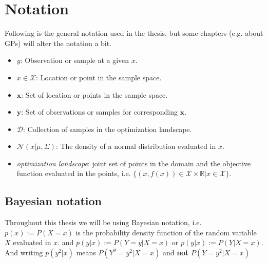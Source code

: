 

\section{Notation}
Following is the general notation used in the thesis, but some chapters (e.g. about GPs) will alter the notation a bit. 
\begin{itemize}[noitemsep]
    \item $y$: Observation or sample at a given $x$.
    \item $x \in \mathcal{X}$: Location or point in the sample space.
    \item $\textbf{x}$: Set of location or points in the sample space.
    \item $\textbf{y}$: Set of observations or samples for corresponding $\textbf{x}$.
    \item $\mathcal{D}$: Collection of samples in the optimization landscape. 
    \item $\mathcal{N}(x|\mu, \Sigma)$: The density of a normal distribution evaluated in $x$.
    \item \textit{optimization landscape}: joint set of points in the domain and the objective function
    evaluated in the points, i.e. $\{(x,f(x))\in \mathcal{X} \times \mathbb{R}| x \in \mathcal{X}\}$.
\end{itemize}

\subsection{Bayesian notation}
Throughout this thesis we will be using Bayesian notation, i.e. $p(x) := P(X=x)$ is the probability
density function of the random variable $X$ evaluated in $x$. and $p(y|x) := P(Y=y|X=x)$ or $p(y|x)
:= P(Y|X=x)$. And writing $p(y^2|x)$ means $P(Y^2=y^2|X=x)$ and \textbf{not} $P(Y=y^2|X=x)$





